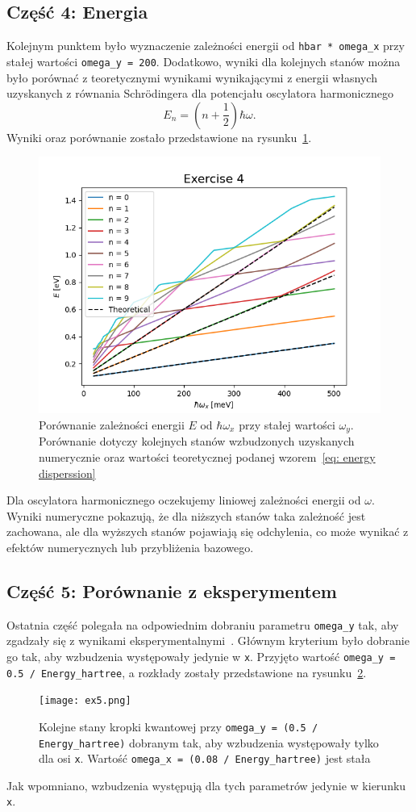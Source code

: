\documentclass{article}
\begin{document}
\subsection{Część 4: Energia}
Kolejnym punktem było wyznaczenie zależności energii od \texttt{hbar * omega\_x} przy stałej wartości \texttt{omega\_y = 200}.
Dodatkowo, wyniki dla kolejnych stanów można było porównać z teoretycznymi wynikami wynikającymi z energii własnych uzyskanych z równania Schr{\"o}dingera dla potencjału oscylatora harmonicznego
\begin{equation}
    E_n = \left(n+\frac{1}{2}\right)\hbar\omega.
    \label{eq: energy disperssion}
\end{equation}
Wyniki oraz porównanie zostało przedstawione na rysunku~\ref{fig:energy of omega ex4}.
\begin{figure}[htp!]
    \centering
    \includegraphics[width=0.75\linewidth]{exercise4.png}
    \caption{Porównanie zależności energii $E$ od $\hbar\omega_x$ przy stałej wartości $\omega_y$.
    Porównanie dotyczy kolejnych stanów wzbudzonych uzyskanych numerycznie oraz wartości teoretycznej podanej wzorem~\eqref{eq: energy disperssion}}
    \label{fig:energy of omega ex4}
\end{figure}
Dla oscylatora harmonicznego oczekujemy liniowej zależności energii od $\omega$. 
Wyniki numeryczne pokazują, że dla niższych stanów taka zależność jest zachowana, ale dla wyższych stanów pojawiają się odchylenia, co może wynikać z efektów numerycznych lub przybliżenia bazowego.
\newpage
\subsection{Część 5: Porównanie z eksperymentem}
Ostatnia część polegała na odpowiednim dobraniu parametru \texttt{omega\_y} tak, aby zgadzały się z wynikami eksperymentalnymi~\cite{Teichmann2013}.
Głównym kryterium było dobranie go tak, aby wzbudzenia występowały jedynie w \texttt{x}.
Przyjęto wartość \texttt{omega\_y = 0.5 / Energy\_hartree}, a rozkłady zostały przedstawione na rysunku~\ref{fig:states ex5}.
\begin{figure}[htp!]
    \centering
    \texttt{[image: ex5.png]}
    \caption{Kolejne stany kropki kwantowej przy \texttt{omega\_y = (0.5 / Energy\_hartree)} dobranym tak, aby wzbudzenia występowały tylko dla osi \texttt{x}. 
    Wartość \texttt{omega\_x = (0.08 / Energy\_hartree)} jest stała}
    \label{fig:states ex5}
\end{figure}
Jak wpomniano, wzbudzenia występują dla tych parametrów jedynie w kierunku \texttt{x}.
\end{document}
